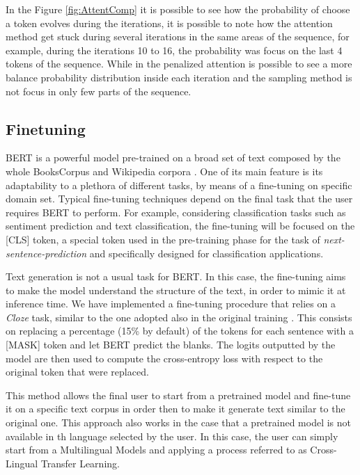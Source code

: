 \documentclass[10pt,twocolumn,letterpaper]{article}
\begin{document}
In the Figure \ref{fig:AttentComp} it is possible to see how the probability of choose a token evolves
during the iterations, it is possible to note how the attention method
get stuck during several iterations in the same areas of the sequence, for example, during the iterations
10 to 16, the probability was focus on the last 4 tokens of the sequence.
While in the penalized attention is possible to see a more balance probability distribution inside each iteration
and the sampling method is not focus in only few parts of the sequence.
\subsection{Finetuning}
BERT is a powerful model pre-trained on a broad set of text composed by the whole
BooksCorpus and Wikipedia corpora \cite{wang2019bert}.
One of its main feature is its adaptability to a plethora of different tasks,
by means of a fine-tuning on specific domain set.
Typical fine-tuning techniques depend on the final task that the user requires BERT to perform.
For example, considering classification tasks such as sentiment prediction and text classification,
the fine-tuning will be focused on the [CLS] token, a special token used in the pre-training
phase for the task of \textit{next-sentence-prediction} and specifically designed for classification applications.

Text generation is not a usual task for BERT.
In this case, the fine-tuning aims to make the model understand the structure of the text,
in order to mimic it at inference time.
We have implemented a fine-tuning procedure that relies on a \textit{Cloze} task, similar to the one adopted also in the
 original training \cite{bert}.
This consists on replacing a percentage (15\% by default) of the tokens for each sentence with a [MASK] token and let
BERT predict the blanks. The logits outputted by the model are then used to compute the cross-entropy
loss with respect to the original token that were replaced.

This method allows the final user to start from a pretrained model and fine-tune it on a specific
text corpus in order then to make it generate text similar to the original one.
This approach also works  in the case that a pretrained model is not available in th language selected by the user.
In this case, the user can simply start from a Multilingual Models and applying a process referred to as 
Cross-Lingual Transfer Learning\cite{crosslanguage}.
\end{document}
